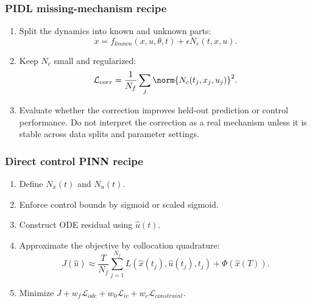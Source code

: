 \documentclass[11pt,a4paper]{article}
\begin{document}
\subsubsection*{PIDL missing-mechanism recipe}
\begin{enumerate}[leftmargin=2em]
    \item Split the dynamics into known and unknown parts:
    \begin{equation}
        \dot{x}=f_{known}(x,u,\theta,t)+\epsilon N_c(t,x,u).
    \end{equation}
    \item Keep $N_c$ small and regularized:
    \begin{equation}
        \mathcal{L}_{corr}=\frac{1}{N_f}\sum_j \norm{N_c(t_j,x_j,u_j)}^2.
    \end{equation}
    \item Evaluate whether the correction improves held-out prediction or control performance. Do not interpret the correction as a real mechanism unless it is stable across data splits and parameter settings.
\end{enumerate}

\subsubsection*{Direct control PINN recipe}
\begin{enumerate}[leftmargin=2em]
    \item Define $N_x(t)$ and $N_u(t)$.
    \item Enforce control bounds by sigmoid or scaled sigmoid.
    \item Construct ODE residual using $\hat{u}(t)$.
    \item Approximate the objective by collocation quadrature:
    \begin{equation}
        J(\hat{u})\approx \frac{T}{N_f}\sum_{j=1}^{N_f} L(\hat{x}(t_j),\hat{u}(t_j),t_j)+\Phi(\hat{x}(T)).
    \end{equation}
    \item Minimize $J+w_f\mathcal{L}_{ode}+w_0\mathcal{L}_{ic}+w_c\mathcal{L}_{constraint}$.
\end{enumerate}
\end{document}
